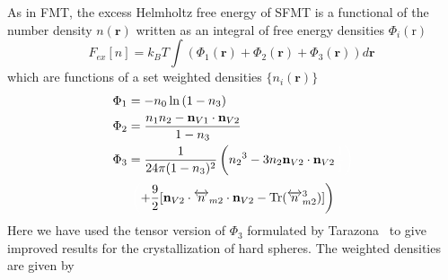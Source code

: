 \documentclass[letterpaper,twocolumn,amsmath,amssymb,prb]{revtex4-1}
\newcommand{\rr}{\textbf{r}}
\newcommand\davidsays[1]{{\bf \color{blue}D: #1}}
\begin{document}
As in FMT, the excess Helmholtz free energy of SFMT is a functional of the number density 
$n(\textbf{r})$ 
written as an integral of free energy densities $\Phi_i(\text{r})$
\begin{equation}
F_\textit{ex}[n] = k_B T \int \left(\Phi_1(\rr) + \Phi_2(\rr) +
\Phi_3(\rr)\right) d\rr \; \label{eq:sfmt-excess-free}
\end{equation}
%
which are functions of a set weighted densities $\lbrace{n_i(\textbf{r})\rbrace}$ 
\begin{align}
\Phi_1 &= -n_0 \ln\left( 1 - n_3\right)\\
\Phi_2 &= \frac{n_1 n_2 - \mathbf{n}_{V1}\cdot\mathbf{n}_{V2}}{1-n_3} \\
\Phi_3 &= \frac{1}{24\pi(1-n_3)^2}\left({n_2}^3-3n_2\mathbf{n}_{V2}
\cdot\mathbf{n}_{V2}\color{white}\frac{1}{1}\right)\color{black}
\label{eq:sfmt-phi3}
\end{align}
\begin{displaymath}\color{white}\left(\color{black}+\frac{9}{2}
[\mathbf{n}_{V2}\cdot{\overleftrightarrow{n}_{m2}}\cdot{\mathbf{n}_{V2}}-
\operatorname{Tr}({\overleftrightarrow{n}^3_{m2}})]\right)\end{displaymath}
Here we have used the tensor version of $\Phi_3$ formulated by 
Tarazona~\cite{tarazona2000,santos2012phi3} to give improved %
results for the crystallization of hard spheres.
The weighted densities %
are given by %
\end{document}
